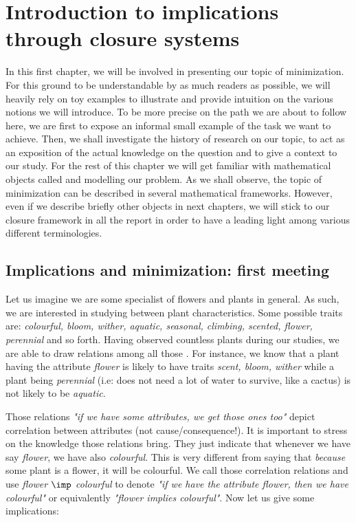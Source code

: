 \chapter{Introduction to implications through closure systems}

In this first chapter, we will be involved in presenting our topic of 
minimization. For this ground to be understandable by as much readers as 
possible, we will heavily rely on toy examples to illustrate and provide 
intuition on the various notions we will introduce. To be more precise on the
path we are about to follow here, we are first to expose an informal
small example of the task we want to achieve. Then, we shall investigate the
history of research on our topic, to act as an exposition of the actual 
knowledge on the question and to give a context to our study. For the rest of
this chapter we will get familiar with mathematical objects called 
 and  modelling our problem.
As we shall observe, the topic of minimization can be described in several 
mathematical frameworks. However, even if we describe briefly other objects
in next chapters, we will stick to our closure framework in all the report in
order to have a leading light among various different terminologies.

\section{Implications and minimization: first meeting}

Let us imagine we are some specialist of flowers and plants in general. As such,
we are interested in studying  between plant 
characteristics. Some possible traits are: \textit{colourful, bloom, wither, 
aquatic, seasonal, climbing, scented, flower, perennial} and so forth. Having
observed countless plants during our studies, we are able to draw relations
among all those . For instance, we know that a plant having
the attribute \textit{flower} is likely to have traits \textit{scent, bloom, 
wither} while a plant being \textit{perennial} (i.e: does not need a lot of
water to survive, like a cactus) is not likely to be \textit{aquatic}. 

\vspace{1.2em}

Those relations \textit{"if we have some attributes, we get those ones too"}
depict correlation between attributes (not cause/consequence!). It is important
to stress on the knowledge those relations bring. They just indicate that 
whenever we have say \textit{flower}, we have also \textit{colourful}. This is 
very different from saying that \textit{because} some plant is a flower, it 
will be colourful. We call those correlation relations 
and use \textit{flower $\imp$ colourful} to denote \textit{"if we have the attribute flower, then we have colourful"} or equivalently \textit{"flower implies colourful"}. Now let us give some implications:


